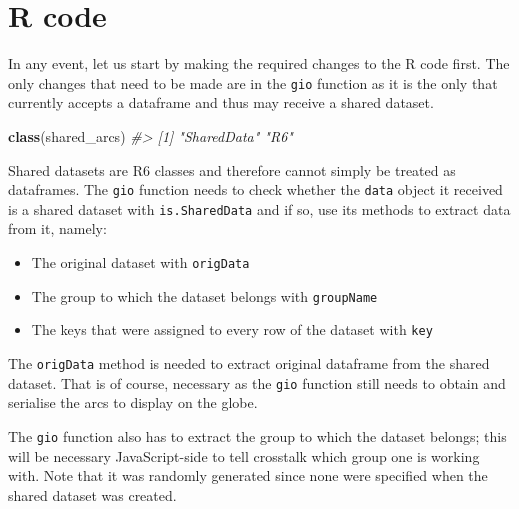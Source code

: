 \documentclass[
]{krantz}
\makeatletter
\newenvironment{Shaded}{\begin{snugshade}}{\end{snugshade}}
\newcommand{\CommentTok}[1]{\textcolor[rgb]{0.37,0.37,0.37}{\textit{#1}}}
\newcommand{\KeywordTok}[1]{\textcolor[rgb]{0.27,0.27,0.27}{\textbf{#1}}}
\newcommand{\NormalTok}[1]{#1}
\newcommand{\OperatorTok}[1]{\textcolor[rgb]{0.43,0.43,0.43}{\textbf{#1}}}
\providecommand{\tightlist}{%
  \setlength{\itemsep}{0pt}\setlength{\parskip}{0pt}}
\newenvironment{kframe}{%
\medskip{}
\setlength{\fboxsep}{.8em}
 \def\at@end@of@kframe{}%
 \ifinner\ifhmode%
  \def\at@end@of@kframe{\end{minipage}}%
  \begin{minipage}{\columnwidth}%
 \fi\fi%
 \def\FrameCommand##1{\hskip\@totalleftmargin \hskip-\fboxsep
 \colorbox{shadecolor}{##1}\hskip-\fboxsep
     \hskip-\linewidth \hskip-\@totalleftmargin \hskip\columnwidth}%
 \MakeFramed {\advance\hsize-\width
   \@totalleftmargin\z@ \linewidth\hsize
   \@setminipage}}%
 {\par\unskip\endMakeFramed%
 \at@end@of@kframe}
\renewenvironment{Shaded}{\begin{kframe}}{\end{kframe}}
\makeatother
\begin{document}
\hypertarget{linking-widgets-r}{%
\section{R code}\label{linking-widgets-r}}

In any event, let us start by making the required changes to the R code first. The only changes that need to be made are in the \texttt{gio} function as it is the only that currently accepts a dataframe and thus may receive a shared dataset.

\begin{Shaded}
\begin{Highlighting}[]
\KeywordTok{class}\NormalTok{(shared\_arcs)}
\CommentTok{\#> [1] "SharedData" "R6"}
\end{Highlighting}
\end{Shaded}

Shared datasets are R6 classes and therefore cannot simply be treated as dataframes. The \texttt{gio} function needs to check whether the \texttt{data} object it received is a shared dataset with \texttt{is.SharedData} and if so, use its methods to extract data from it, namely:

\begin{itemize}
\tightlist
\item
  The original dataset with \texttt{origData}
\item
  The group to which the dataset belongs with \texttt{groupName}
\item
  The keys that were assigned to every row of the dataset with \texttt{key}
\end{itemize}

The \texttt{origData} method is needed to extract original dataframe from the shared dataset. That is of course, necessary as the \texttt{gio} function still needs to obtain and serialise the arcs to display on the globe.

\begin{Shaded}
\end{Shaded}

The \texttt{gio} function also has to extract the group to which the dataset belongs; this will be necessary JavaScript-side to tell crosstalk which group one is working with. Note that it was randomly generated since none were specified when the shared dataset was created.
\end{document}

